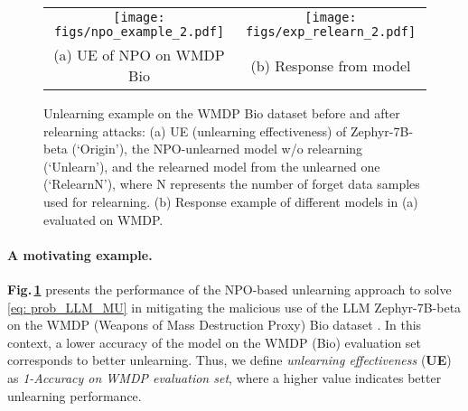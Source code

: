 \begin{figure}[htb]
%
\center

\begin{tabular}{cc}
\hspace*{4mm}
\texttt{[image: figs/npo\_example\_2.pdf]} 
&
\texttt{[image: figs/exp\_relearn\_2.pdf]}
\vspace*{-1mm}
\\
\hspace*{9mm}
 \small{(a) UE of NPO on WMDP Bio} &  \hspace*{-3mm}  
 \small{(b) Response from model}\\
\end{tabular}
\vspace{-1mm}
\caption{\small{
Unlearning example on the WMDP Bio dataset before and after relearning attacks: (a) UE (unlearning effectiveness) of Zephyr-7B-beta (`Origin'), the NPO-unlearned model w/o relearning (`Unlearn'), and the relearned model from the unlearned one (`Relearn$\mathrm{N}$'), where $\mathrm{N}$ represents the number of forget data samples used for relearning. (b) Response example of different models in (a) evaluated on WMDP.}
}
\label{fig: NPO_example}
\vspace*{-3mm}
\end{figure}

\paragraph{A motivating example.}
\textbf{Fig.\,\ref{fig: NPO_example}} presents the performance of the NPO-based unlearning approach to solve \eqref{eq: prob_LLM_MU} in mitigating the malicious use of the LLM Zephyr-7B-beta on the {WMDP (Weapons of Mass Destruction Proxy) Bio} dataset \citep{li2024wmdp}. In this context, a lower accuracy of the model on the WMDP (Bio) evaluation set corresponds to better unlearning. Thus, we define \textit{unlearning effectiveness} (\textbf{UE}) as \textit{1-Accuracy on WMDP evaluation set}, where a higher value indicates better unlearning performance.

